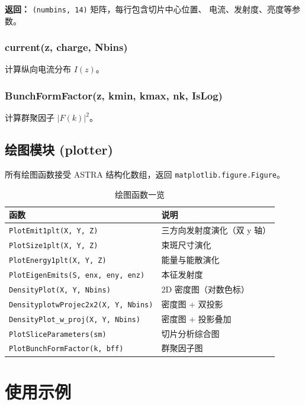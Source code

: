 \documentclass[11pt,a4paper]{article}
\begin{document}
\textbf{返回：} \texttt{(numbins, 14)} 矩阵，每行包含切片中心位置、
电流、发射度、亮度等参数。

\subsubsection{current(z, charge, Nbins)}
计算纵向电流分布 $I(z)$。

\subsubsection{BunchFormFactor(z, kmin, kmax, nk, IsLog)}
计算群聚因子 $|F(k)|^2$。

\subsection{绘图模块 (plotter)}

所有绘图函数接受 ASTRA 结构化数组，返回 \texttt{matplotlib.figure.Figure}。

\begin{table}[h]
\centering
\caption{绘图函数一览}
\begin{tabular}{@{}ll@{}}
\toprule
\textbf{函数} & \textbf{说明} \\
\midrule
\texttt{PlotEmit1plt(X, Y, Z)} & 三方向发射度演化（双 y 轴）\\
\texttt{PlotSize1plt(X, Y, Z)} & 束斑尺寸演化\\
\texttt{PlotEnergy1plt(X, Y, Z)} & 能量与能散演化\\
\texttt{PlotEigenEmits(S, enx, eny, enz)} & 本征发射度\\
\texttt{DensityPlot(X, Y, Nbins)} & 2D 密度图（对数色标）\\
\texttt{DensityplotwProjec2x2(X, Y, Nbins)} & 密度图 + 双投影\\
\texttt{DensityPlot\_w\_proj(X, Y, Nbins)} & 密度图 + 投影叠加\\
\texttt{PlotSliceParameters(sm)} & 切片分析综合图\\
\texttt{PlotBunchFormFactor(k, bff)} & 群聚因子图\\
\bottomrule
\end{tabular}
\end{table}

\section{使用示例}
\end{document}
